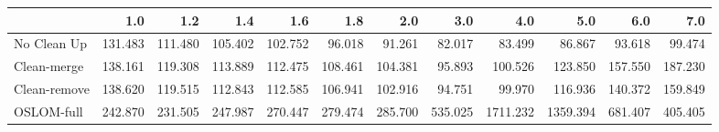 \begin{tabular}{lrrrrrrrrrrr}
\toprule
{} &     1.0 &     1.2 &     1.4 &     1.6 &     1.8 &     2.0 &     3.0 &      4.0 &      5.0 &     6.0 &     7.0 \\
\midrule
No Clean Up  & 131.483 & 111.480 & 105.402 & 102.752 &  96.018 &  91.261 &  82.017 &   83.499 &   86.867 &  93.618 &  99.474 \\
Clean-merge  & 138.161 & 119.308 & 113.889 & 112.475 & 108.461 & 104.381 &  95.893 &  100.526 &  123.850 & 157.550 & 187.230 \\
Clean-remove & 138.620 & 119.515 & 112.843 & 112.585 & 106.941 & 102.916 &  94.751 &   99.970 &  116.936 & 140.372 & 159.849 \\
OSLOM-full   & 242.870 & 231.505 & 247.987 & 270.447 & 279.474 & 285.700 & 535.025 & 1711.232 & 1359.394 & 681.407 & 405.405 \\
\bottomrule
\end{tabular}
